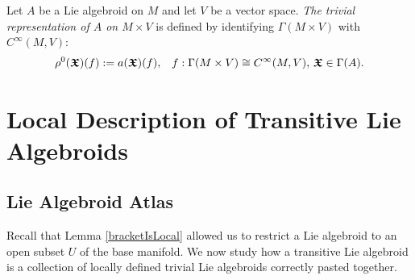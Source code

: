 
\begin{definition}
Let $A$ be a Lie algebroid on $M$ and let $V$ be a vector space. \emph{The trivial representation of $A$ on $M \times V$} is defined by identifying $\Gamma(M \times V)$ with $C^\infty(M, V)$:
\begin{align*}
    \rho^0(\bm{\mathfrak{X}})(f) := a(\bm{\mathfrak{X}})(f), && f: \Gamma(M \times V) \cong C^\infty(M, V),\, \bm{\mathfrak{X}} \in \Gamma(A).
\end{align*}
\end{definition}


\section{Local Description of Transitive Lie Algebroids}\label{chBasicSectionLocalDescription}

\subsection{Lie Algebroid Atlas}
\label{chBasicSubsectionAtlas}

Recall that Lemma \ref{bracketIsLocal} allowed us to restrict a Lie algebroid to an open subset $U$ of the base manifold. We now study how a transitive Lie algebroid is a collection of locally defined trivial Lie algebroids correctly pasted together.

